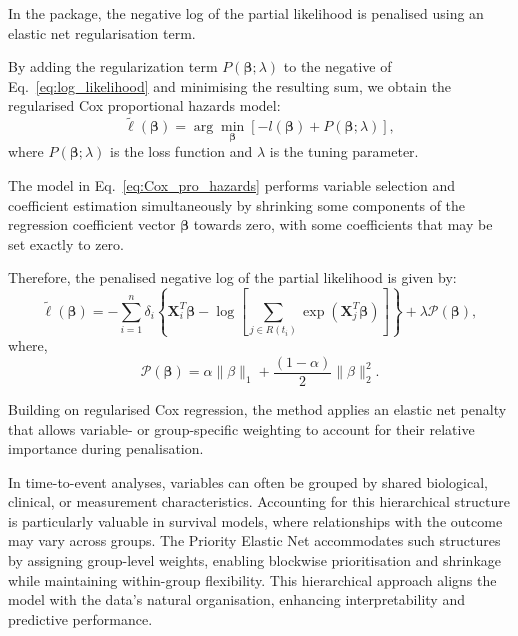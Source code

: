 In the  package, the negative log of the partial likelihood is penalised using an elastic net regularisation term.

By adding the regularization term \( P(\boldsymbol{\beta}; \lambda) \) to the negative
of Eq.~\eqref{eq:log_likelihood} and minimising the resulting sum, we obtain the regularised Cox proportional hazards model:
\begin{equation}
\tilde{\ell}(\boldsymbol{\beta})= 
\arg \min_{\bm{\beta}}
\left[ -l(\boldsymbol{\beta} ) + P(\boldsymbol{\beta}; \lambda) \right],
\label{eq:Cox_pro_hazards}
\end{equation}
where $P(\boldsymbol{\beta}; \lambda)$ is the loss function and \( \lambda \) is the tuning parameter.

The model in Eq.~\eqref{eq:Cox_pro_hazards} performs variable selection and coefficient estimation simultaneously by shrinking some components of the regression coefficient vector $ \boldsymbol{\beta}$ towards zero, with some coefficients that may be set exactly to zero.

Therefore, the penalised negative log of the partial likelihood is given by:
\begin{equation}
\tilde{\ell}(\boldsymbol{\beta}) = -\sum_{i=1}^{n} \delta_i \left\{ \mathbf{X}_i^T \boldsymbol{\beta} - \log \left[ \sum_{j \in R(t_i)} \exp{\left( \mathbf{X}_j^T \boldsymbol{\beta} \right)} \right] \right\} + \lambda \mathcal{P}(\boldsymbol{\beta}),
\end{equation}
\noindent where,
\begin{equation*}
\mathcal{P}(\boldsymbol{\beta}) = \alpha \|\beta\|_1 + \frac{(1 - \alpha)}{2} \|\beta\|_2^2.
\end{equation*}

Building on regularised Cox regression, the method applies an elastic net penalty that allows variable- or group-specific weighting to account for their relative importance during penalisation.

In time-to-event analyses, variables can often be grouped by shared biological, clinical, or measurement characteristics. Accounting for this hierarchical structure is particularly valuable in survival models, where relationships with the outcome may vary across groups. The Priority Elastic Net accommodates such structures by assigning group-level weights, enabling blockwise prioritisation and shrinkage while maintaining within-group flexibility. This hierarchical approach aligns the model with the data’s natural organisation, enhancing interpretability and predictive performance.

